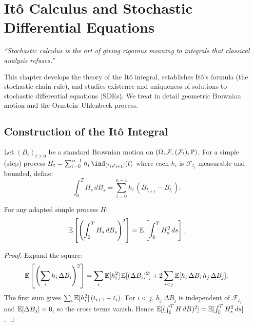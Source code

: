\chapter{It\^o Calculus and Stochastic Differential Equations}
\label{ch:ito_sde}

\begin{center}
\textit{``Stochastic calculus is the art of giving rigorous meaning
to integrals that classical analysis refuses.''}
\end{center}

\bigskip

This chapter develops the theory of the It\^o integral, establishes
It\^o's formula (the stochastic chain rule), and studies existence
and uniqueness of solutions to stochastic differential equations (SDEs).
We treat in detail geometric Brownian motion and the Ornstein--Uhlenbeck
process.

\section{Construction of the It\^o Integral}
\label{sec:ito_integral}

\begin{definition}
Let $(B_t)_{t \geq 0}$ be a standard Brownian motion on
$(\Omega, \mathcal{F}, (\mathcal{F}_t), \mathbb{P})$. For a simple
(step) process $H_t = \sum_{i=0}^{n-1} h_i\,\ind_{(t_i, t_{i+1}]}(t)$
where each $h_i$ is $\mathcal{F}_{t_i}$-measurable and bounded, define:
\[
  \int_0^T H_s\,dB_s = \sum_{i=0}^{n-1} h_i\,(B_{t_{i+1}} - B_{t_i}).
\]
\end{definition}

\begin{theorem}[It\^o Isometry]
\label{thm:isometry}
For any adapted simple process $H$:
\[
  \mathbb{E}\left[\left(\int_0^T H_s\,dB_s\right)^2\right]
  = \mathbb{E}\left[\int_0^T H_s^2\,ds\right].
\]
\end{theorem}

\begin{proof}
Expand the square:
\[
  \mathbb{E}\left[\left(\sum_i h_i\,\Delta B_i\right)^2\right]
  = \sum_i \mathbb{E}[h_i^2]\,\mathbb{E}[(\Delta B_i)^2]
    + 2\sum_{i < j} \mathbb{E}[h_i\,\Delta B_i\,h_j\,\Delta B_j].
\]
The first sum gives $\sum_i \mathbb{E}[h_i^2]\,(t_{i+1} - t_i)$. For $i < j$,
$h_j\,\Delta B_j$ is independent of $\mathcal{F}_{t_j}$ and
$\mathbb{E}[\Delta B_j] = 0$, so the cross terms vanish. Hence
$\mathbb{E}[(\int_0^T H\,dB)^2] = \mathbb{E}[\int_0^T H_s^2\,ds]$.
\end{proof}

